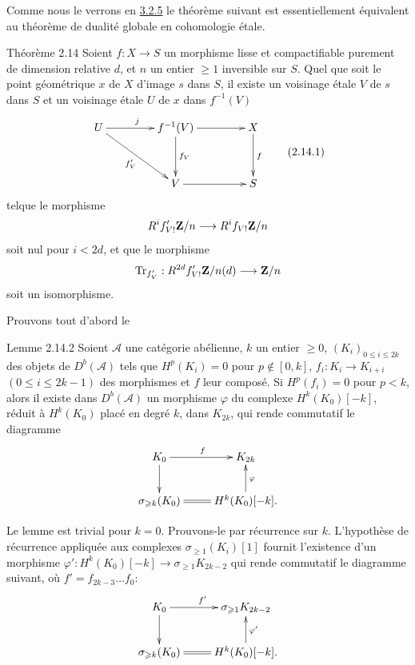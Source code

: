 \documentclass[10pt]{../fichiers-configuration-latex/smfart}
\begin{document}
Comme nous le verrons en \hyperref[XVIII.thm3.2.5]{3.2.5} le théorème suivant est
essentiellement équivalent au théorème de dualité globale en
cohomologie étale.

\begin{enonce*}{Théorème 2.14}
Soient $f:X\rightarrow S$ un morphisme lisse et compactifiable
purement de dimension relative $d$, et $n$ un entier $\geq 1$
inversible sur $S$. Quel que soit le point géométrique $x$ de $X$
d'image $s$ dans $S$, il existe un voisinage étale $V$ de $s$ dans $S$
et un voisinage étale $U$ de $x$ dans $f^{-1}(V)$
\begin{equation*}
\vcenter{
\xymatrix@C=1.5cm@R=1.25cm{
U \ar[rd]_{f'_V} \ar[r]^{j} & f^{-1}(V)   \ar[r] \ar[d]^{f_V}& X\ar[d]^{f}\\
                                             &     V           \ar[r]  & S
}}\tag{2.14.1}
\end{equation*}%
tel\pageoriginale que le morphisme 
$$
R^{i}f'_{V!}\mathbf{Z}/n\longrightarrow R^{i}f_{V!}\mathbf{Z}/n
$$
soit nul pour $i<2d$, et que le morphisme
$$
\operatorname{Tr}_{f'_{V}}:R^{2d}f'_{V!}\mathbf{Z}/n(d)\longrightarrow \mathbf{Z}/n
$$
soit un isomorphisme.
\end{enonce*}

Prouvons tout d'abord le

\begin{enonce*}{Lemme 2.14.2}
Soient $\mathcal{A}$ une catégorie abélienne, $k$ un entier $\geq 0$,
$(K_{i})_{0\leq i\leq 2k}$ des objets de $D^{b}(\mathcal{A})$ tels que
$H^{p}(K_{i})=0$ pour $p\not\in [0,k]$, $f_{i}:K_{i}\rightarrow
K_{i+i}$ $(0\leq i\leq 2k-1)$ des morphismes et $f$ leur composé. Si
$H^{p}(f_{i})=0$ pour $p<k$, alors il existe dans $D^{b}(\mathcal{A})$
un morphisme $\varphi$ du complexe $H^{k}(K_{0})[-k]$, réduit à
$H^{k}(K_{0})$ placé en degré $k$, dans $K_{2k}$, qui rende commutatif
le diagramme
$$
\xymatrix{
K_{0}  \ar[d]\ar[r]^{f} & K_{2k}\\
\sigma_{\geq k}(K_{0})  \ar@{=}[r] & H^{k}(K_{0})[-k] \ar[u]_{\varphi}.
}
$$
\end{enonce*}

Le lemme est trivial pour $k=0$. Prouvons-le par récurrence sur
$k$. L'hypothèse de récurrence appliquée aux complexes $\sigma_{\geq
1}(K_{i})[1]$ fournit l'existence d'un morphisme
$\varphi':H^{k}(K_{0})[-k]\rightarrow \sigma_{\geq 1}K_{2k-2}$ qui
rende commutatif le diagramme suivant, où $f'=f_{2k-3}\ldots f_{0}$:
$$
\xymatrix{
K_{0}  \ar[d]\ar[r]^{f'} & \sigma_{\geq 1}K_{2k-2}            \\
\sigma_{\geq k}(K_{0})  \ar@{=}[r] & H^{k}(K_{0})[-k]. \ar[u]_{\varphi'}
}
$$
\end{document}
